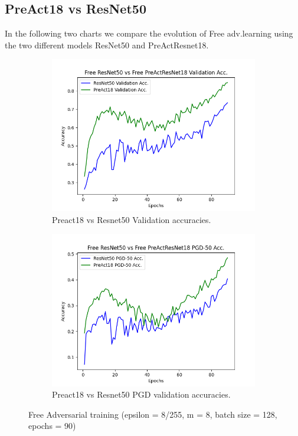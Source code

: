 \documentclass{article}
\begin{document}
\subsection{PreAct18 vs ResNet50}
In the following two charts we compare the evolution of Free adv.learning using
the two different models ResNet50 and PreActResnet18.



\begin{figure}[hbt!]
  \centering
  \begin{subfigure}[b]{0.4\linewidth}
    \includegraphics[width=\linewidth]{images/freeComp/Figure_1.png}
    \caption{Preact18 vs Resnet50  Validation accuracies.}
  \end{subfigure}
  \begin{subfigure}[b]{0.4\linewidth}
    \includegraphics[width=\linewidth]{images/freeComp/Figure_2.png}
    \caption{Preact18 vs Resnet50 PGD validation accuracies.}
  \end{subfigure}
  \caption{Free Adversarial training (epsilon = 8/255, m = 8, batch size = 128,  epochs = 90)}
  \label{fig:coffee}
\end{figure}
\end{document}
